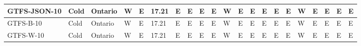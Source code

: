 \begin{table}[]
{\begin{tabular}{|l|l|l|l|l|l|l|l|l|l|l|l|l|l|l|l|l|l|l|l|l|}
GTFS-JSON-10                                            & Cold                   & Ontario        & W           & E           & 17.21       & E           & E           & E           & E           & W           & E           & E            & E            & E            & E            & W            & E            & E            & E            & E            \\ \hline
GTFS-B-10                                               & Cold                   & Ontario        & W           & E           & 17.21       & E           & E           & E           & E           & W           & E           & E            & E            & E            & E            & W            & E            & E            & E            & E            \\ \hline
GTFS-W-10                                               & Cold                   & Ontario        & W           & E           & 17.21       & E           & E           & E           & E           & W           & E           & E            & E            & E            & E            & W            & E            & E            & E            & E            \\ \hline
\end{tabular}%
}
\end{table}


